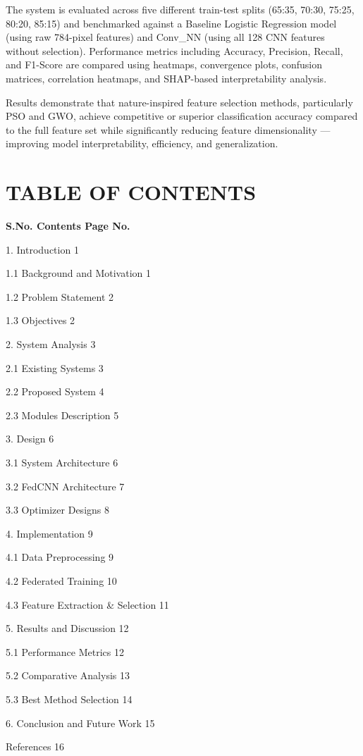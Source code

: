 \documentclass[
]{article}
\begin{document}
The system is evaluated across five different train-test splits (65:35,
70:30, 75:25, 80:20, 85:15) and benchmarked against a Baseline Logistic
Regression model (using raw 784-pixel features) and Conv\_NN (using all
128 CNN features without selection). Performance metrics including
Accuracy, Precision, Recall, and F1-Score are compared using heatmaps,
convergence plots, confusion matrices, correlation heatmaps, and
SHAP-based interpretability analysis.

Results demonstrate that nature-inspired feature selection methods,
particularly PSO and GWO, achieve competitive or superior classification
accuracy compared to the full feature set while significantly reducing
feature dimensionality --- improving model interpretability, efficiency,
and generalization.

\hypertarget{table-of-contents}{%
\section{TABLE OF CONTENTS}\label{table-of-contents}}

\textbf{S.No. Contents Page No.}

1. Introduction 1

1.1 Background and Motivation 1

1.2 Problem Statement 2

1.3 Objectives 2

2. System Analysis 3

2.1 Existing Systems 3

2.2 Proposed System 4

2.3 Modules Description 5

3. Design 6

3.1 System Architecture 6

3.2 FedCNN Architecture 7

3.3 Optimizer Designs 8

4. Implementation 9

4.1 Data Preprocessing 9

4.2 Federated Training 10

4.3 Feature Extraction \& Selection 11

5. Results and Discussion 12

5.1 Performance Metrics 12

5.2 Comparative Analysis 13

5.3 Best Method Selection 14

6. Conclusion and Future Work 15

References 16
\end{document}
